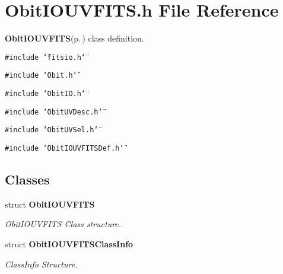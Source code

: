 \section{Obit\-IOUVFITS.h File Reference}
\label{ObitIOUVFITS_8h}
{\bf Obit\-IOUVFITS}{\rm (p.\,\pageref{structObitIOUVFITS})} class definition. 

{\tt \#include \char`\"{}fitsio.h\char`\"{}}\par
{\tt \#include \char`\"{}Obit.h\char`\"{}}\par
{\tt \#include \char`\"{}Obit\-IO.h\char`\"{}}\par
{\tt \#include \char`\"{}Obit\-UVDesc.h\char`\"{}}\par
{\tt \#include \char`\"{}Obit\-UVSel.h\char`\"{}}\par
{\tt \#include \char`\"{}Obit\-IOUVFITSDef.h\char`\"{}}\par
\subsection*{Classes}
\begin{CompactItemize}
\item 
struct {\bf Obit\-IOUVFITS}
\begin{CompactList}\small\item\em Obit\-IOUVFITS Class structure. \item\end{CompactList}\item 
struct {\bf Obit\-IOUVFITSClass\-Info}
\begin{CompactList}\small\item\em Class\-Info Structure. \item\end{CompactList}\end{CompactItemize}
